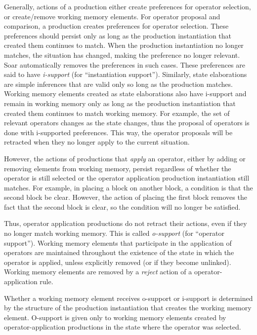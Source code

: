 Generally, actions of a production either create preferences for
operator selection, or create/remove working memory elements.  For
operator proposal and comparison, a production creates preferences for
operator selection.  These preferences should persist only as long as
the production instantiation that created them continues to match.  When
the production instantiation no longer matches, the situation has
changed, making the preference no longer relevant.  Soar automatically
removes the preferences in such cases.  These preferences are said to
have \emph{i-support} (for ``instantiation support'').  Similarly, state
elaborations are simple inferences that are valid only so long as the
production matches.  Working memory elements created as state
elaborations also have i-support and remain in working memory only as
long as the production instantiation that created them continues to
match working memory.  For example, the set of relevant operators changes
as the state changes, thus the proposal of operators is done with
i-supported preferences. This way, the operator proposals will be
retracted when they no longer apply to the current situation.

However, the actions of productions that \emph{apply} an operator, either
by adding or removing elements from working memory, persist regardless of
whether the operator is still selected or the operator application 
production instantiation still matches. For example, in placing a
block on another block, a condition is that the second block be
clear. However, the action of placing the first block removes the fact
that the second block is clear, so the condition will no longer be
satisfied.

Thus, operator application productions do not retract their actions, even
if they no longer match working memory.  This is called \emph{o-support} 
(for ``operator support''). Working memory elements that participate in
the application of operators are maintained throughout the existence of
the state in which the operator is applied, unless explicitly removed (or
if they become unlinked).  Working memory elements are removed by a
\emph{reject} action of a operator-application rule.  

Whether a working memory element receives o-support or i-support is
determined by the structure of the production instantiation that creates
the working memory element.  O-support is given only to working memory
elements created by operator-application productions in the state where
the operator was selected.


